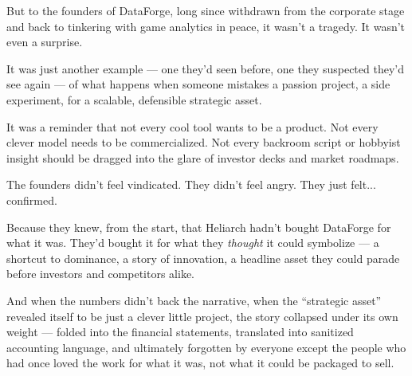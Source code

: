 \medskip

But to the founders of DataForge, long since withdrawn from the corporate stage and back to tinkering with game analytics in peace, it wasn’t a tragedy.
It wasn’t even a surprise.

It was just another example —
one they’d seen before,
one they suspected they’d see again —
of what happens when someone mistakes a passion project, a side experiment,
for a scalable, defensible strategic asset.

It was a reminder that not every cool tool wants to be a product.
Not every clever model needs to be commercialized.
Not every backroom script or hobbyist insight should be dragged into the glare of investor decks and market roadmaps.

The founders didn’t feel vindicated.
They didn’t feel angry.
They just felt... confirmed.

Because they knew, from the start, that Heliarch hadn’t bought DataForge for what it was.
They’d bought it for what they \textit{thought} it could symbolize —
a shortcut to dominance, a story of innovation, a headline asset they could parade before investors and competitors alike.

And when the numbers didn’t back the narrative,
when the “strategic asset” revealed itself to be just a clever little project,
the story collapsed under its own weight —
folded into the financial statements,
translated into sanitized accounting language,
and ultimately forgotten by everyone except the people who had once loved the work for what it was,
not what it could be packaged to sell.


